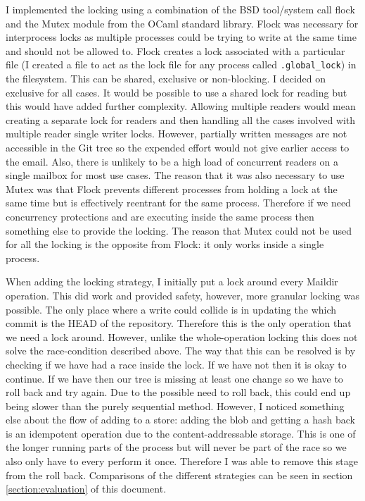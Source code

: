 I implemented the locking using a combination of the BSD tool/system call flock\cite{manual_flock} and the Mutex module from the OCaml standard library. Flock was necessary for interprocess locks as multiple processes could be trying to write at the same time and should not be allowed to. Flock creates a lock associated with a particular file (I created a file to act as the lock file for any process called \texttt{.global\_lock}) in the filesystem. This can be shared, exclusive or non-blocking. I decided on exclusive for all cases. It would be possible to use a shared lock for reading but this would have added further complexity. Allowing multiple readers would mean creating a separate lock for readers and then handling all the cases involved with multiple reader single writer locks. However, partially written messages are not accessible in the Git tree so the expended effort would not give earlier access to the email. Also, there is unlikely to be a high load of concurrent readers on a single mailbox for most use cases. The reason that it was also necessary to use Mutex was that Flock prevents different processes from holding a lock at the same time but is effectively reentrant for the same process. Therefore if we need concurrency protections and are executing inside the same process then something else to provide the locking. The reason that Mutex could not be used for all the locking is the opposite from Flock: it only works inside a single process.

When adding the locking strategy, I initially put a lock around every Maildir operation. This did work and provided safety, however, more granular locking was possible. The only place where a write could collide is in updating the which commit is the HEAD of the repository. Therefore this is the only operation that we need a lock around. However, unlike the whole-operation locking this does not solve the race-condition described above. The way that this can be resolved is by checking if we have had a race inside the lock. If we have not then it is okay to continue. If we have then our tree is missing at least one change so we have to roll back and try again. Due to the possible need to roll back, this could end up being slower than the purely sequential method. However, I noticed something else about the flow of adding to a store: adding the blob and getting a hash back is an idempotent operation due to the content-addressable storage. This is one of the longer running parts of the process but will never be part of the race so we also only have to every perform it once. Therefore I was able to remove this stage from the roll back. Comparisons of the different strategies can be seen in section \ref{section:evaluation} of this document.


